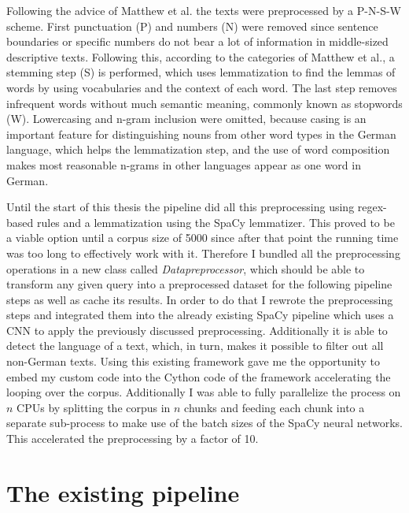 Following the advice of Matthew et al. \cite{dennymatthewpennstateuniversity;spirlingarthurnewyorkuniversityReplicationDataText2017} the texts were preprocessed by a P-N-S-W scheme. First punctuation (P) and numbers (N) were removed since sentence boundaries or specific numbers do not bear a lot of information in middle-sized descriptive texts. Following this, according to the categories of Matthew et al., a stemming step (S) is performed, which uses lemmatization to find the lemmas of words by using vocabularies and the context of each word. The last step removes infrequent words without much semantic meaning, commonly known as stopwords (W). Lowercasing and n-gram inclusion were omitted, because casing is an important feature for distinguishing nouns from other word types in the German language, which helps the lemmatization step, and the use of word composition makes most reasonable n-grams in other languages appear as one word in German. 

Until the start of this thesis the pipeline did all this preprocessing using regex-based rules and a lemmatization using the SpaCy lemmatizer. This proved to be a viable option until a corpus size of 5000 since after that point the running time was too long to effectively work with it. Therefore I bundled all the preprocessing operations in a new class called \textit{Datapreprocessor}, which should be able to transform any given query into a preprocessed dataset for the following pipeline steps as well as cache its results. In order to do that I rewrote the preprocessing steps and integrated them into the already existing SpaCy pipeline which uses a CNN to apply the previously discussed preprocessing. Additionally it is able to detect the language of a text, which, in turn, makes it possible to filter out all non-German texts. Using this existing framework gave me the opportunity to embed my custom code into the Cython code of the framework accelerating the looping over the corpus. Additionally I was able to fully parallelize the process on $n$ CPUs by splitting the corpus in $n$ chunks and feeding each chunk into a separate sub-process to make use of the batch sizes of the SpaCy neural networks. This accelerated the preprocessing by a factor of 10.

\section{The existing pipeline}

